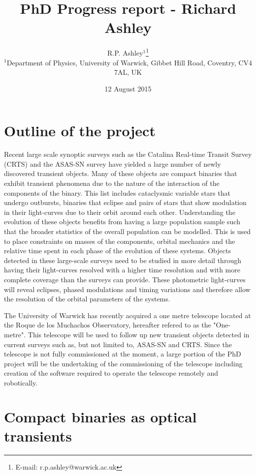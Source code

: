 \documentclass[a4paper,fleqn,usenatbib]{mnras}
\title[Richard Ashley - PhD project]{PhD Progress report - Richard Ashley}
\author[R.P. Ashley et al.]{
R.P. Ashley$^{1}$\thanks{E-mail: r.p.ashley@warwick.ac.uk}\\
$^{1}$Department of Physics, University of Warwick, Gibbet Hill Road, Coventry, CV4 7AL, UK\\
}
\date{12 August 2015}
\begin{document}
\label{firstpage}
\pagerange{\pageref{firstpage}--\pageref{lastpage}}
\maketitle




\section{Outline of the project}
Recent large scale synoptic surveys such as the Catalina Real-time Transit Survey (CRTS)  and the ASAS-SN survey have yielded a large number of newly discovered transient objects. Many of these objects are compact binaries that exhibit transient phenomena due to the nature of the interaction of the components of the binary. This list includes cataclysmic variable stars that undergo outbursts, binaries that eclipse and pairs of stars that show modulation in their light-curves due to their orbit around each other. Understanding the evolution of these objects benefits from having a large population sample such that the broader statistics of the overall population can be modelled. This is used to place constraints on masses of the components, orbital mechanics and the relative time spent in each phase of the evolution of these systems. Objects detected in these large-scale surveys need to be studied in more detail through having their light-curves resolved with a higher time resolution and with more complete coverage than the surveys can provide. These photometric light-curves will reveal eclipses, phased modulations and timing variations and therefore allow the resolution of the orbital parameters of the systems. 

The University of Warwick has recently acquired a one metre telescope located at the Roque de los Muchachos Observatory, hereafter refered to as the "One-metre". This telescope will be used to follow up new transient objects detected in current surveys such as, but not limited to, ASAS-SN and CRTS. Since the telescope is not fully commissioned at the moment, a large portion of the PhD project will be the undertaking of the commissioning of the telescope including creation of the software required to operate the telescope remotely and robotically. 


\section{Compact binaries as optical transients}
\end{document}
